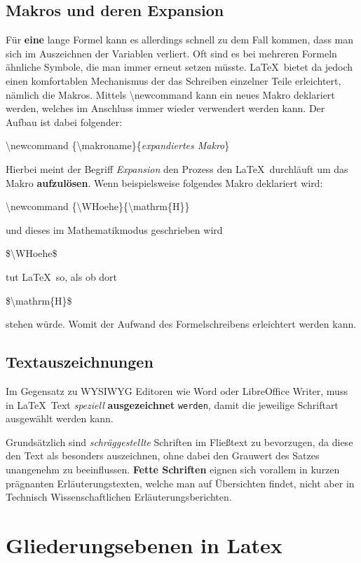 \documentclass[logo/language=en]{tudcdartcl}
\begin{document}
\subsection{Makros und deren Expansion}

Für \textbf{eine} lange Formel kann es allerdings schnell zu dem Fall kommen, dass man sich im Auszeichnen der Variablen verliert. Oft sind es bei mehreren Formeln ähnliche Symbole, die man immer erneut setzen müsste.
\LaTeX \, bietet da jedoch einen komfortablen Mechanismus der das Schreiben einzelner Teile erleichtert, nämlich die Makros. Mittels \textbackslash newcommand kann ein neues Makro deklariert werden, welches im Anschluss immer wieder verwendert werden kann. Der Aufbau ist dabei folgender:

\textbackslash newcommand \{\textbackslash makroname\}\{\textit{expandiertes Makro}\}

Hierbei meint der Begriff \textit{Expansion} den Prozess den \LaTeX \, durchläuft um das Makro \textbf{aufzulösen}. Wenn beispielsweise folgendes Makro deklariert wird:

\textbackslash newcommand \{\textbackslash WHoehe\}\{\textbackslash mathrm\{H\}\}

und dieses im Mathematikmodus geschrieben wird

\$\textbackslash WHoehe\$

tut \LaTeX \, so, als ob dort

\$\textbackslash mathrm\{H\}\$

stehen würde. Womit der Aufwand des Formelschreibens erleichtert werden kann.

\subsection{Textauszeichnungen}

Im Gegensatz zu WYSIWYG Editoren wie Word oder LibreOffice Writer, muss in \LaTeX\, Text \textit{speziell} \textbf{ausgezeichnet} \texttt{werden}, damit die jeweilige Schriftart ausgewählt werden kann.

Grundsätzlich sind \textit{schräggestellte} Schriften im Fließtext zu bevorzugen, da diese den Text als besonders auszeichnen, ohne dabei den Grauwert des Satzes unangenehm zu beeinflussen. \textbf{Fette Schriften} eignen sich vorallem in kurzen prägnanten Erläuterungstexten, welche man auf Übersichten findet, nicht aber in Technisch Wissenschaftlichen Erläuterungsberichten.

\section*{Gliederungsebenen in Latex}
\end{document}
